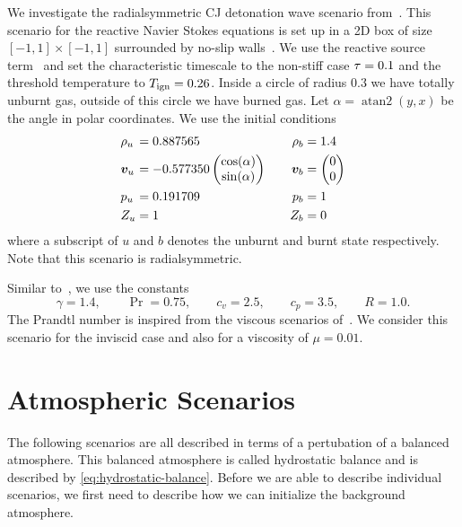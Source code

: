 We investigate the radialsymmetric CJ detonation wave scenario from~\cite{helzel2000modified}.
This scenario for the reactive Navier Stokes equations is set up in a 2D box of size $[-1, 1] \times [-1, 1]$ surrounded by no-slip walls~.
We use the reactive source term~ and set the characteristic timescale to the non-stiff case $\tau = 0.1$ and the threshold temperature to $T_{\text{ign}} = 0.26$.
Inside a circle of radius $0.3$ we have totally unburnt gas, outside of this circle we have burned gas.
Let $\alpha =  \operatorname{atan2}(y,x)$ be the angle in polar coordinates.
We use the initial conditions
\begin{equation}
\begin{alignedat}{6}
  & \rho_u &&= 0.887565 \qquad& \rho_b &= 1.4\\
  & \bm{v}_u &&= -0.577350
  \begin{pmatrix}
     \cos (\alpha)\\
     \sin (\alpha)
   \end{pmatrix}  \qquad& \bm{v}_b  &=
   \begin{pmatrix}
     0 \\
     0
   \end{pmatrix}\\
   & p_u &&=0.191709 \qquad& p_b &= 1\\
   & Z_u &&= 1 \quad& Z_b &= 0
  \end{alignedat}
\end{equation}
where a subscript of $u$ and $b$ denotes the unburnt and burnt state respectively.
Note that this scenario is radialsymmetric.

Similar to~\cite{helzel2000modified}, we use the constants
\begin{equation}
  \gamma = 1.4 ,\qquad \Pr = 0.75, \qquad c_v = 2.5 ,\qquad c_p = 3.5 ,\qquad R = 1.0.
\end{equation}
The Prandtl number is inspired from the viscous scenarios of~\cite{hidalgo2011ader}.
We consider this scenario for the inviscid case and also for a viscosity of $\mu = 0.01$.

\section{Atmospheric Scenarios}
The following scenarios are all described in terms of a pertubation of a balanced atmosphere.
This balanced atmosphere is called hydrostatic balance and is described by \cref{eq:hydrostatic-balance}.
Before we are able to describe individual scenarios, we first need to describe how we can initialize the background atmosphere.

